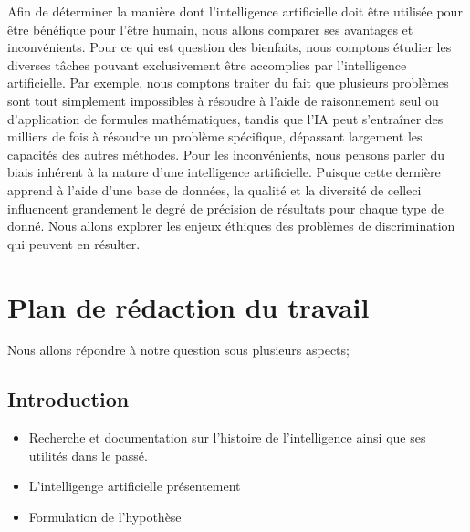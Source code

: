 \documentclass[letterpaper,10pt,french]{sphinxmanual}
\begin{document}
Afin de déterminer la manière dont l’intelligence artificielle doit être utilisée pour être bénéfique pour l’être humain, nous allons comparer ses avantages et inconvénients. Pour ce qui est question des bienfaits, nous comptons étudier les diverses tâches pouvant exclusivement être accomplies par l’intelligence artificielle. Par exemple, nous comptons traiter du fait que plusieurs problèmes sont tout simplement impossibles à résoudre à l’aide de raisonnement seul ou d’application de formules mathématiques, tandis que l’IA peut s’entraîner des milliers de fois à résoudre un problème spécifique, dépassant largement les capacités des autres méthodes. Pour les inconvénients, nous pensons parler du biais inhérent à la nature d’une intelligence artificielle. Puisque cette dernière apprend à l’aide d’une base de données, la qualité et la diversité de celle\sphinxhyphen{}ci influencent grandement le degré de précision de résultats pour chaque type de donné. Nous allons explorer les enjeux éthiques des problèmes de discrimination qui peuvent en résulter.


\section{Plan de rédaction du travail}
\label{\detokenize{plan:plan-de-redaction-du-travail}}\label{\detokenize{plan::doc}}
Nous allons répondre à notre question sous plusieurs aspects;


\subsection{Introduction}
\label{\detokenize{plan:introduction}}\begin{itemize}
\item {} 
Recherche et documentation sur l’histoire de l’intelligence ainsi que ses
utilités dans le passé.

\item {} 
L’intelligenge artificielle présentement

\item {} 
Formulation de l’hypothèse

\end{itemize}
\end{document}
